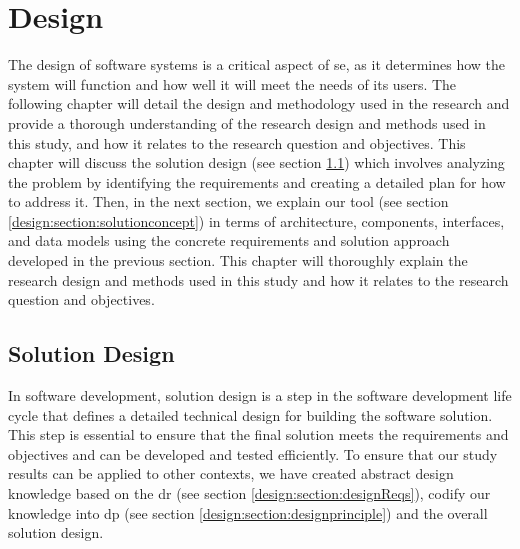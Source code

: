 
\chapter{Design}

\ifpdf
    \graphicspath{{Chapters/Design/Figs/}{Chapters/Design/Figs/}{Chapters/Design/Figs/}}
\else
    \graphicspath{{Chapters/Design/Figs/}{Chapters/Design/Figs/}}
\fi
The design of software systems is a critical aspect of \ac{se}, as it determines how the system will function and how well it will meet the needs of its users.
The following chapter will detail the design and methodology used in the research and provide a thorough understanding of the research design and methods used in this study, and how it relates to the research question and objectives.
This chapter will discuss the solution design (see section \ref{design:section:soldesign}) which involves analyzing the problem by identifying the requirements and creating a detailed plan for how to address it.
Then, in the next section, we explain our tool (see section \ref{design:section:solutionconcept}) in terms of architecture, components, interfaces, and data models using the concrete requirements and solution approach developed in the previous section. 
This chapter will thoroughly explain the research design and methods used in this study and how it relates to the research question and objectives.
\section{Solution Design}
\label{design:section:soldesign}
In software development, solution design is a step in the software development life cycle that defines a detailed technical design for building the software solution.
This step is essential to ensure that the final solution meets the requirements and objectives and can be developed and tested efficiently.
To ensure that our study results can be applied to other contexts, we have created abstract design knowledge based on the \ac{dr} (see section \ref{design:section:designReqs}), codify our knowledge into \ac{dp} (see section \ref{design:section:designprinciple}) and the overall solution design.
